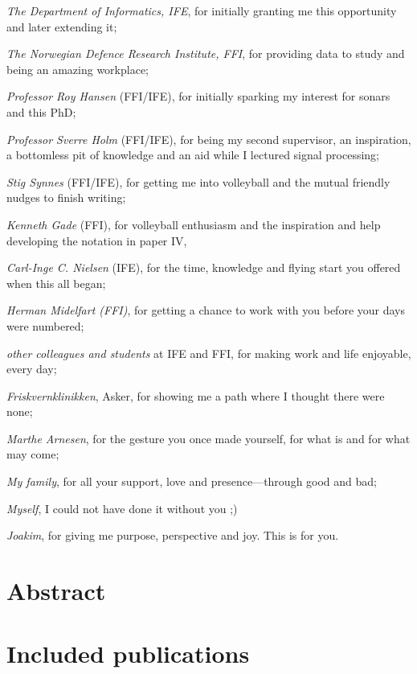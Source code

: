 \emph{The Department of Informatics, IFE}, for initially granting me this opportunity and later extending it;

\emph{The Norwegian Defence Research Institute, FFI}, for providing data to study and being an amazing workplace;

\emph{Professor Roy Hansen} (FFI/IFE), for initially sparking my interest for sonars and this PhD;

\emph{Professor Sverre Holm} (FFI/IFE), for being my second supervisor, an inspiration, a bottomless pit of knowledge and an aid while I lectured signal processing;

\emph{Stig Synnes} (FFI/IFE), for getting me into volleyball and the mutual friendly nudges to finish writing;

\emph{Kenneth Gade} (FFI), for volleyball enthusiasm and the inspiration and help developing the notation in paper IV,

\emph{Carl-Inge C. Nielsen} (IFE), for the time, knowledge and flying start you offered when this all began;

\emph{Herman Midelfart (FFI)}, for getting a chance to work with you before your days were numbered;

\emph{other colleagues and students} at IFE and FFI, for making work and life enjoyable, every day;

\emph{Friskvernklinikken}, Asker, for showing me a path where I thought there were none;

\emph{Marthe Arnesen}, for the gesture you once made yourself, for what is and for what may come;

\emph{My family}, for all your support, love and presence---through good and bad;

\emph{Myself}, I could not have done it without you ;)

\emph{Joakim}, for giving me purpose, perspective and joy. This is for you. 



\newpage
\chapter*{Abstract}




\newpage
\chapter*{Included publications}

